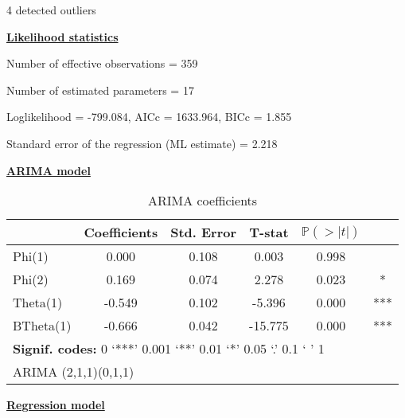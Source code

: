 \documentclass[
]{article}
\begin{document}
4 detected outliers

\underline{\textbf{Likelihood statistics}}

Number of effective observations = 359

Number of estimated parameters = 17

Loglikelihood = -799.084, AICc = 1633.964, BICc = 1.855

Standard error of the regression (ML estimate) = 2.218

\underline{\textbf{ARIMA model}}

\begin{table}[H]
\centering
\caption{\label{tab:unnamed-chunk-3}ARIMA coefficients}
\centering
\begin{tabular}[t]{lccccc}
\toprule
  & Coefficients & Std. Error & T-stat & $\mathbb P (> \lvert t \rvert)$ & \\
\midrule
Phi(1) & 0.000 & 0.108 & 0.003 & 0.998 & \\
Phi(2) & 0.169 & 0.074 & 2.278 & 0.023 & *\\
Theta(1) & -0.549 & 0.102 & -5.396 & 0.000 & ***\\
BTheta(1) & -0.666 & 0.042 & -15.775 & 0.000 & ***\\
\bottomrule
\multicolumn{6}{l}{\rule{0pt}{1em}\textbf{Signif. codes: }0 `***' 0.001 `**' 0.01 `*' 0.05 `.' 0.1 ` ' 1}\\
\multicolumn{6}{l}{\rule{0pt}{1em}ARIMA (2,1,1)(0,1,1)}\\
\end{tabular}
\end{table}

\underline{\textbf{Regression model}}
\end{document}
